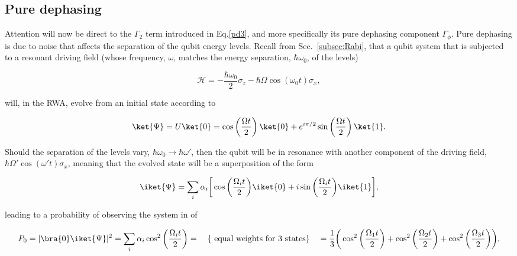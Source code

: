  \subsection{Pure dephasing}
 Attention will  now be direct to  the $ \Gamma_2 $  term introduced in
 Eq.\eqref{pd3},  and more  specifically its  pure dephasing  component
 $ \Gamma_\phi  $.  Pure  dephasing is  due to  noise that  affects the
 separation    of   the    qubit    energy    levels.    Recall    from
 Sec.~\ref{subsec:Rabi}, that  a qubit  system that  is subjected  to a
 resonant driving  field (whose  frequency, $ \omega  $, matches  the energy
 separation, $ \hbar\omega_0 $, of the levels)

  \begin{equation}\label{RabiHamiltonian}
    \mathcal{H} = -\frac{\hbar\omega_0}{2}\sigma_z-\hbar\Omega\cos(\omega_0 t)\sigma_x,
  \end{equation}

  \noindent will,  in the  RWA, evolve from  an initial  state 
  according to

  \begin{equation}\label{RabuSolution}
    \ket{\Psi} = U\ket{0} = \cos\left(\frac{\Omega t}{2}\right)\ket{0}+e^{i\pi/2}\sin\left(\frac{\Omega t}{2}\right)\ket{1}.
  \end{equation}

  \noindent    Should   the    separation   of    the   levels    vary,
  $ \hbar\omega_0 \rightarrow \hbar\omega' $, then the qubit will be in resonance
  with     another     component      of     the     driving     field,
  $  \hbar\Omega'\cos(\omega't)\sigma_x  $,  meaning that  the  evolved
  state will be a superposition of the form

  \begin{equation}\label{RabuSolutionSuperpos}
    \iket{\Psi} = \sum_i \alpha_i\bigg[\cos\bigg(\frac{\Omega_i t}{2}\bigg)\iket{0}+i\sin\bigg(\frac{\Omega_i t}{2}\bigg)\iket{1}\bigg],
  \end{equation}

  \noindent  leading  to  a  probability of  observing  the  system  in
   of

  \begin{equation}\label{RabiProb0}
    P_0  = |\bra{0}\iket{\Psi}|^2 = \sum_i \alpha_i\cos^2\bigg(\frac{\Omega_it}{2}\bigg)=\quad \left\lbrace \text{ equal weights for 3 states}\right\rbrace \quad= \frac{1}{3}\bigg(\cos^2\bigg(\frac{\Omega_1t}{2}\bigg)+\cos^2\bigg(\frac{\Omega_2t}{2}\bigg)+\cos^2\bigg(\frac{\Omega_3t}{2}\bigg)\bigg),
  \end{equation}

